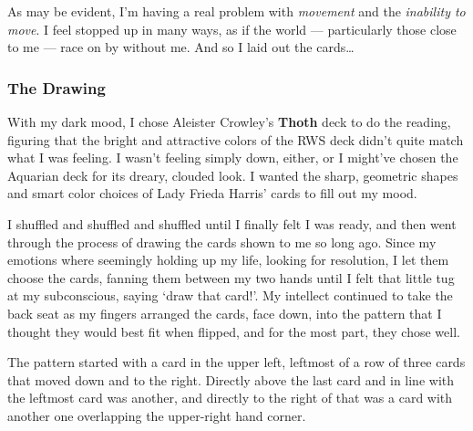 As may be evident, I'm having a real problem with \emph{movement} and
the \emph{inability to move}.  I feel stopped up in many ways, as if
the world --- particularly those close to me --- race on by without me.
And so I laid out the cards\ldots

\subsubsection*{The Drawing}
With my dark mood, I chose Aleister Crowley's
\textbf{Thoth}\cite{tarotThoth} deck to do the
reading, figuring that the bright and attractive colors of the RWS deck
didn't quite match what I was feeling.  I wasn't feeling simply down,
either, or I might've chosen the Aquarian deck for its dreary, clouded
look.  I wanted the sharp, geometric shapes and smart color choices of
Lady Frieda Harris' cards to fill out my mood.

I shuffled and shuffled and shuffled until I finally felt I was ready,
and then went through the process of drawing the cards shown to me so
long ago.  Since my emotions where seemingly holding up my life, looking
for resolution, I let them choose the cards, fanning them between my two
hands until I felt that little tug at my subconscious, saying `draw that
card!'.  My intellect continued to take the back seat as my fingers
arranged the cards, face down, into the pattern that I thought they
would best fit when flipped, and for the most part, they chose well.

The pattern started with a card in the upper left, leftmost of a row of
three cards that moved down and to the right.  Directly above the last
card and in line with the leftmost card was another, and directly to the
right of that was a card with another one overlapping the upper-right
hand corner.


